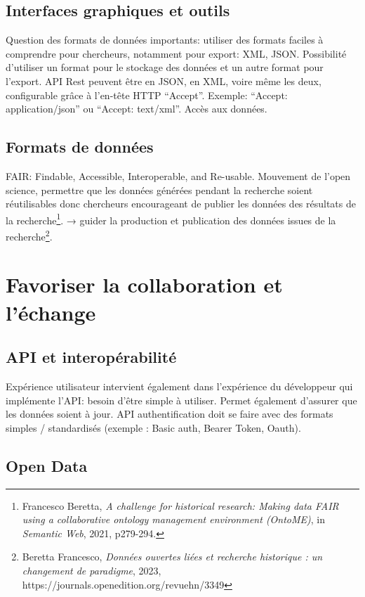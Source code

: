     
    \subsection{Interfaces graphiques et outils}

Question des formats de données importants: utiliser des formats faciles à comprendre pour chercheurs, notamment pour export: XML, JSON. Possibilité d’utiliser un format pour le stockage des données et un autre format pour l’export. 
API Rest peuvent être en JSON, en XML, voire même les deux, configurable grâce à l’en-tête HTTP “Accept”. Exemple: “Accept: application/json” ou “Accept: text/xml”. Accès aux données. 

    \subsection{Formats de données}

FAIR: Findable, Accessible, Interoperable, and Re-usable. Mouvement de l’open science, permettre que les données générées pendant la recherche soient réutilisables donc chercheurs encourageant de publier les données des résultats de la recherche\footnote{Francesco Beretta, \textit{A challenge for historical research: Making data FAIR using a collaborative ontology management environment (OntoME)}, in \textit{Semantic Web}, 2021, p279-294.}.
→ guider la production et publication des données issues de la recherche\footnote{Beretta Francesco, \textit{Données ouvertes liées et recherche historique : un changement de paradigme}, 2023, https://journals.openedition.org/revuehn/3349}.
    
    \section{Favoriser la collaboration et l'échange}


    \subsection{API et interopérabilité}

Expérience utilisateur intervient également dans l’expérience du développeur qui implémente l’API: besoin d’être simple à utiliser. Permet également d’assurer que les données soient à jour. API authentification doit se faire avec des formats simples / standardisés (exemple : Basic auth, Bearer Token, Oauth). 
    
    \subsection{Open Data}